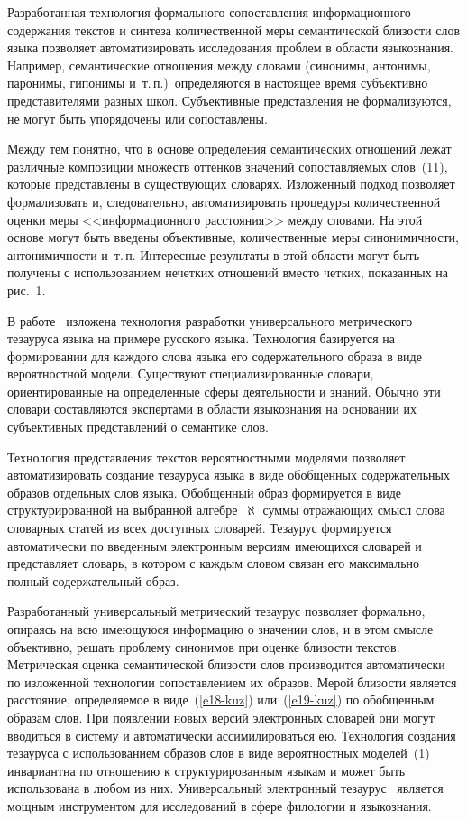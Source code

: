 \begin{multicols}{2}
  Разработанная технология формального сопоставления информационного
содержания текстов и синтеза количественной меры семантической\linebreak
 близости
слов языка позволяет автоматизировать исследования проблем в об\-ласти
языкознания. Например, семантические отношения между словами (синонимы,
антонимы, паронимы, гипонимы и~т.\,п.)\ определяются в настоящее время
субъективно представителями разных школ. Субъективные представления не
формализуются, не могут быть упорядочены или сопоставлены.

  Между тем понятно, что в основе определения семантических отношений
лежат различные композиции множеств оттенков значений со\-по\-став\-ля\-емых
слов~(11), которые представлены в существующих словарях. Изложенный
подход позволяет формализовать и, следовательно, автоматизировать
процедуры количественной оценки меры <<информационного расстояния>>
между словами. На этой основе могут быть введены объективные,
количественные меры синонимичности, антонимичности и~т.\,п. Интересные
результаты в этой области могут быть получены с использованием нечетких
отношений вместо четких, показанных на рис.~1.

  В работе~\cite{14-kuz} изложена технология разработки универсального
метрического тезауруса языка на примере русского языка. Технология
базируется на формировании для каждого слова языка его содержательного
образа в виде вероятностной модели. Существуют специализированные
словари, ориентированные на определенные сферы деятельности и знаний.
Обычно эти словари составляются экспертами в области языкознания на
основании их субъективных представлений о семантике слов.

  Технология представления текстов вероятностными моделями позволяет
автоматизировать со\-здание тезауруса языка в виде обобщенных
со\-держательных образов отдельных слов языка. Обобщен\-ный образ
формируется в виде структурированной на выбранной алгебре~$\aleph$ суммы
отражающих смысл слова словарных статей из всех доступных словарей.
Тезаурус формируется автоматически по введенным электронным версиям
имеющихся словарей и представляет словарь, в котором с каждым словом
связан его максимально полный содержательный образ.

  Разработанный универсальный метрический тезаурус позволяет формально,
опираясь на всю имеющуюся информацию о значении слов, и в этом смысле
объективно, решать проблему синонимов при оценке близости текстов.
Метрическая оценка семантической близости слов производится автоматически
по изложенной технологии со\-по\-став\-ле\-ни\-ем их образов. Мерой близости
является расстояние, определяемое в виде~(\ref{e18-kuz}) или~(\ref{e19-kuz})
по обобщенным образам слов. При появлении новых версий электронных
словарей они могут вводиться в систему и автоматически ассимилироваться ею.
Технология создания тезауруса с использованием образов слов в виде
вероятностных моделей~(1) инвариантна по отношению к структурированным
языкам и может быть использована в любом из них. Универсальный
электронный тезаурус~\cite{14-kuz} является мощным инструментом для
исследований в сфере филологии и языкознания.


\end{multicols}
